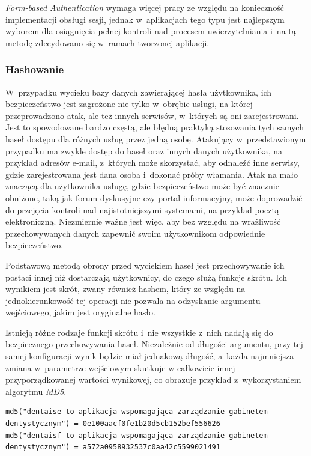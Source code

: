 \documentclass[11pt]{aghdpl}
\begin{document}
\emph{Form-based Authentication} wymaga więcej pracy ze względu na konieczność implementacji obsługi sesji, jednak w~aplikacjach tego typu jest najlepszym wyborem dla osiągnięcia pełnej kontroli nad procesem uwierzytelniania i~na tą metodę zdecydowano się w~ramach tworzonej aplikacji.

\subsubsection{Hashowanie}
\label{sec:hashowanie}

W~przypadku wycieku bazy danych zawierającej hasła użytkownika, ich bezpieczeństwo jest zagrożone nie tylko w~obrębie usługi, na której przeprowadzono atak, ale też innych serwisów, w~których są oni zarejestrowani. Jest to spowodowane bardzo częstą, ale błędną praktyką stosowania tych samych haseł dostępu dla różnych usług przez jedną osobę. Atakujący w~przedstawionym przypadku ma zwykle dostęp do haseł oraz innych danych użytkownika, na przykład adresów e-mail, z~których może skorzystać, aby odnaleźć inne serwisy, gdzie zarejestrowana jest dana osoba i~dokonać próby włamania. Atak na mało znaczącą dla użytkownika usługę, gdzie bezpieczeństwo może być znacznie obniżone, taką jak forum dyskusyjne czy portal informacyjny, może doprowadzić do przejęcia kontroli nad najistotniejszymi systemami, na przykład pocztą elektroniczną. Niezmiernie ważne jest więc, aby bez względu na wrażliwość przechowywanych danych zapewnić swoim użytkownikom odpowiednie bezpieczeństwo.

Podstawową metodą obrony przed wyciekiem haseł jest przechowywanie ich postaci innej niż dostarczają użytkownicy, do czego służą funkcje skrótu. Ich wynikiem jest skrót, zwany również hashem, który ze względu na jednokierunkowość tej operacji nie pozwala na odzyskanie argumentu wejściowego, jakim jest oryginalne hasło.

Istnieją różne rodzaje funkcji skrótu i~nie wszystkie z~nich nadają się do bezpiecznego przechowywania haseł. Niezależnie od długości argumentu, przy tej samej konfiguracji wynik będzie miał jednakową długość, a~każda najmniejsza zmiana w~parametrze wejściowym skutkuje w całkowicie innej przyporządkowanej wartości wynikowej, co obrazuje przykład z~wykorzystaniem algorytmu \emph{MD5}.

\begin{lstlisting}
md5("dentaise to aplikacja wspomagająca zarządzanie gabinetem dentystycznym") = 0e100aacf0fe1b20d5cb152bef556626
md5("dentaisf to aplikacja wspomagająca zarządzanie gabinetem dentystycznym") = a572a0958932537c0aa42c5599021491
\end{lstlisting}
\end{document}
